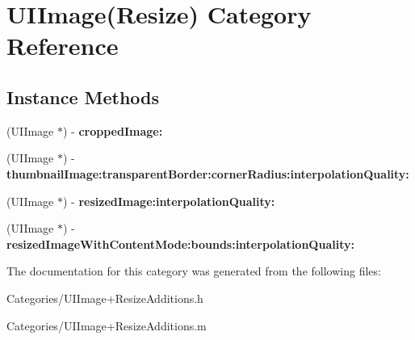 \hypertarget{category_u_i_image_07_resize_08}{}\section{U\+I\+Image(Resize) Category Reference}
\label{category_u_i_image_07_resize_08}
\subsection*{Instance Methods}
\begin{DoxyCompactItemize}
\item 
\hypertarget{category_u_i_image_07_resize_08_a5496ab7471269a0c928b0c7374f919ea}{}(U\+I\+Image $\ast$) -\/ {\bfseries cropped\+Image\+:}\label{category_u_i_image_07_resize_08_a5496ab7471269a0c928b0c7374f919ea}

\item 
\hypertarget{category_u_i_image_07_resize_08_a761afde374b0ddb4c89cd931cddea414}{}(U\+I\+Image $\ast$) -\/ {\bfseries thumbnail\+Image\+:transparent\+Border\+:corner\+Radius\+:interpolation\+Quality\+:}\label{category_u_i_image_07_resize_08_a761afde374b0ddb4c89cd931cddea414}

\item 
\hypertarget{category_u_i_image_07_resize_08_a04a2ca6e89cd8c4368f449b926d17fa9}{}(U\+I\+Image $\ast$) -\/ {\bfseries resized\+Image\+:interpolation\+Quality\+:}\label{category_u_i_image_07_resize_08_a04a2ca6e89cd8c4368f449b926d17fa9}

\item 
\hypertarget{category_u_i_image_07_resize_08_ace0d648f421dfa7557f83a784cdec374}{}(U\+I\+Image $\ast$) -\/ {\bfseries resized\+Image\+With\+Content\+Mode\+:bounds\+:interpolation\+Quality\+:}\label{category_u_i_image_07_resize_08_ace0d648f421dfa7557f83a784cdec374}

\end{DoxyCompactItemize}


The documentation for this category was generated from the following files\+:\begin{DoxyCompactItemize}
\item 
Categories/U\+I\+Image+\+Resize\+Additions.\+h\item 
Categories/U\+I\+Image+\+Resize\+Additions.\+m\end{DoxyCompactItemize}

